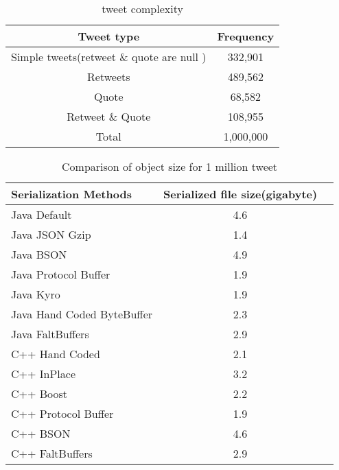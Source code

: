 \begin{table}
	\centering
	\caption{tweet complexity }
	\label{tbl:object_size}
	\begin{adjustbox}{width=\columnwidth,center}	
		
		\begin{tabular}{|c|c|} \hline
			Tweet type & Frequency\\ \hline
			Simple tweets(retweet \& quote are null ) & 332,901\\ \hline
			Retweets & 489,562\\ \hline
			Quote & 68,582\\ \hline
			Retweet \& Quote & 108,955\\ \hline
			Total & 1,000,000 \\ \hline
			
			\hline\end{tabular}
	\end{adjustbox}
\end{table}

\begin{table}
	\centering
	\caption{Comparison of object size for 1 million tweet }
	\label{tbl:object_size}
	\begin{adjustbox}{width=\columnwidth,center}	
		
		\begin{tabular}{|l|c|c|} \hline
		 \textbf{Serialization Methods} & \textbf{Serialized file size(gigabyte)}\\ \hline
			Java Default  & 4.6 \\ \hline	
			Java JSON Gzip  & 1.4 \\ \hline	
			Java BSON  & 4.9 \\ \hline	
			Java Protocol Buffer  & 1.9 \\ \hline	
			Java Kyro  & 1.9 \\ \hline	
			Java Hand Coded ByteBuffer  & 2.3 \\ \hline	
			Java FaltBuffers  & 2.9 \\ \hline	
			C++ Hand Coded  & 2.1 \\ \hline	
			C++ InPlace  & 3.2 \\ \hline	
			C++ Boost  & 2.2 \\ \hline	
			C++ Protocol Buffer  & 1.9 \\ \hline
			C++ BSON  & 4.6 \\ \hline	
			C++ FaltBuffers  & 2.9 \\ \hline				
			\hline\end{tabular}
	\end{adjustbox}
\end{table}


